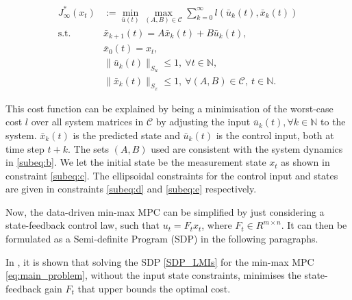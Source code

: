 \begin{subequations}
	\begin{align*}
		J_\infty^*(x_t) &:= \min_{\bar{u}(t)} \max_{(A, B) \in \mathcal{C}} \sum_{k=0}^{\infty} l\left(\bar{u}_k(t), \bar{x}_k(t)\right) \\
		\text{s.t.} \quad & \bar{x}_{k+1}(t) = A \bar{x}_k(t) + B \bar{u}_k(t), \\
		& \bar{x}_0(t) = x_t, \\
		& \|\bar{u}_k(t)\|_{S_u} \leq 1, \ \forall t \in \mathbb{N}, \\
		& \|\bar{x}_k(t)\|_{S_x} \leq 1, \ \forall \left(A, B\right) \in \mathcal{C}, \ t \in \mathbb{N} .
	\end{align*}
\end{subequations}

This cost function can be explained by being a minimisation of the worst-case cost $l$ over all system matrices in $\mathcal{C}$ by adjusting the input $\bar{u}_k(t), \forall k \in \mathbb{N}$ to the system. $\bar{x}_k(t)$ is the predicted state and $\bar{u}_k(t)$ is the control input, both at time step $t+k$.
The sets $(A,B)$ used are consistent with the system dynamics in \eqref{subeq:b}. We let the initial state be the measurement state $x_t$ as shown in constraint \eqref{subeq:c}.
The ellipsoidal constraints for the control input and states are given in constraints \eqref{subeq:d} and \eqref{subeq:e} respectively.

Now, the data-driven min-max MPC can be simplified by just considering a state-feedback control law, such that $u_t = F_t x_t$, where $F_t \in R^{m \times n}$. It can then be formulated as a Semi-definite Program (SDP) in the following paragraphs.

In \cite{xie2024}, it is shown that solving the SDP \eqref{SDP_LMIs} for the min-max MPC \eqref{eq:main_problem}, without the input state constraints, minimises the state-feedback gain $F_t$ that upper bounds the optimal cost.


